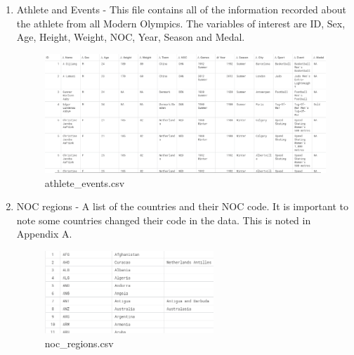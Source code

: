\documentclass[a4 paper, 12pt]{article}
\begin{document}
        \begin{enumerate}
            \item Athlete and Events - This file contains all of the information recorded about the athlete from all Modern Olympics. The variables of interest are ID, Sex, Age, Height, Weight, NOC, Year, Season and Medal. 
                \begin{figure} [H]
                    \centering
                    \includegraphics[width=\textwidth, frame]
                        {../images/history_data.png} 
                    \caption{athlete\_events.csv}                  
                \end{figure}            
            \item NOC regions - A list of the countries and their NOC code. It is important to note some countries changed their code in the data. This is noted in Appendix A. 
                \begin{figure}[H]
                    \centering
                    \includegraphics[width=0.6\textwidth, frame]
                    {../images//noc_data.png}   
                    \caption{noc\_regions.csv}                 
            \end{figure}
        \end{enumerate}
\end{document}
